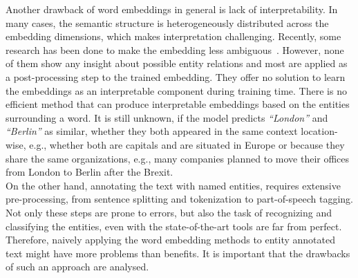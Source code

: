 Another drawback of word embeddings in general is lack of interpretability. In many cases, the semantic structure is heterogeneously distributed across the embedding dimensions, which makes interpretation challenging. Recently, some research has been done to make the embedding less ambiguous~. However, none of them show any insight about possible entity relations and most are applied as a post-processing step to the trained embedding. They offer no solution to learn the embeddings as an interpretable component during training time. There is no efficient method that can produce interpretable embeddings based on the entities surrounding a word. It is still unknown, if the model predicts \emph{``London''} and \emph{``Berlin''} as similar, whether they both appeared in the same context location-wise, e.g., whether both are capitals and are situated in Europe or because they share the same organizations, e.g., many companies planned to move their offices from London to Berlin after the Brexit. \\
On the other hand, annotating the text with named entities, requires extensive pre-processing, from sentence splitting and tokenization to part-of-speech tagging. Not only these steps are prone to errors, but also the task of recognizing and classifying the entities, even with the state-of-the-art tools are far from perfect. Therefore, naively applying the word embedding methods to entity annotated text might have more problems than benefits. It is important that the drawbacks of such an approach are analysed. 

%


